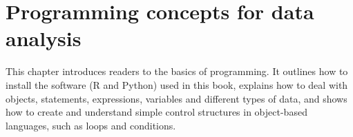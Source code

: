 \chapter{Programming concepts for data analysis}

This chapter introduces readers to the basics of programming. It outlines how to install the software (R and Python) used in this book, explains how to deal with objects, statements, expressions, variables and different types of data, and shows how to create and understand simple control structures in object-based languages, such as loops and conditions.






